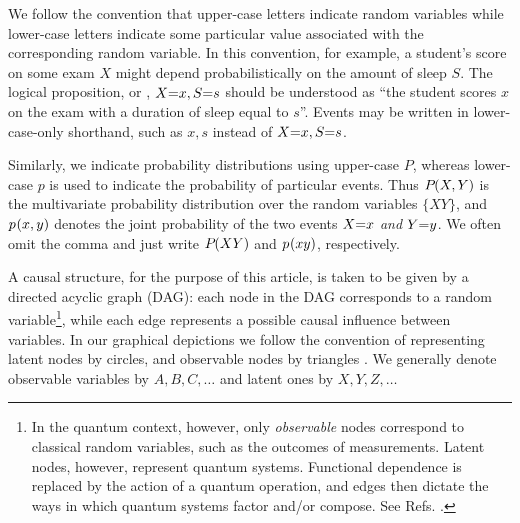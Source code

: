 We follow the convention that upper-case letters indicate random variables while lower-case letters indicate some particular value associated with the corresponding random variable. In this convention, for example, a student's score on some exam $X$ might depend probabilistically on the amount of sleep $S$. The logical proposition, or , $X\mathord{=}x,S\mathord{=}s$ should be understood as ``the student scores $x$ on the exam with a duration of sleep equal to $s$''. Events may be written in lower-case-only shorthand, such as $x,s$ instead of $X\mathord{=}x,S\mathord{=}s$.

Similarly, we indicate probability distributions using upper-case $P$, whereas lower-case $p$ is used to indicate the probability of particular events. Thus ${P_{}}\lparen X, Y\rparen$ is the multivariate probability distribution over the random variables $\{X Y\}$, and ${p_{}}\lparen x, y\rparen$ denotes the joint probability of the two events $X\mathord{=}x$ \emph{and} $Y\mathord{=}y$. We often omit the comma and just write ${P_{}}\lparen X Y\rparen$ and ${p_{}}\lparen x y\rparen$, respectively.


A causal structure, for the purpose of this article, is taken to be given by a directed acyclic graph (DAG): each node in the DAG corresponds to a random variable\footnote{In the quantum context, however, only \emph{observable} nodes correspond to classical random variables, such as the outcomes of measurements. Latent nodes, however, represent quantum systems. Functional dependence is replaced by the action of a quantum operation, and edges then dictate the ways in which quantum systems factor and/or compose. See Refs. \cite{pusey2014gdag,leifer2013conditionalstates}. }, while each edge represents a possible causal influence between variables. In our graphical depictions we follow the convention of representing latent nodes by circles, and observable nodes by triangles \cite{pusey2014gdag}. We generally denote observable variables by $A,B,C,\ldots$ and latent ones by $X,Y,Z,\ldots$

